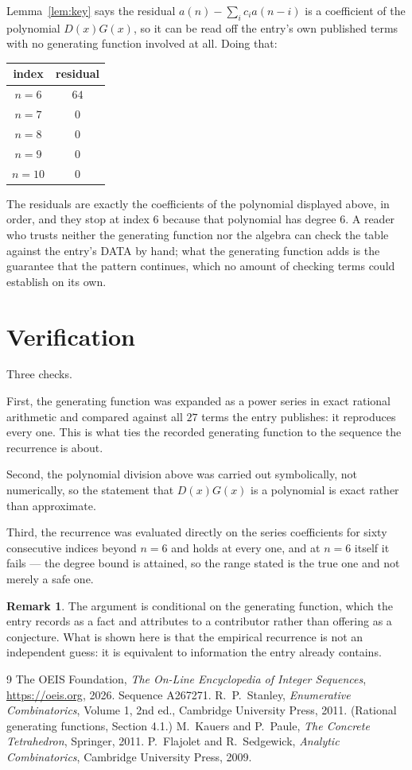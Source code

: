 \documentclass[11pt,a4paper]{article}
\theoremstyle{plain}
\theoremstyle{definition}
\newtheorem{remark}[theorem]{Remark}
\begin{document}
Lemma~\ref{lem:key} says the residual $a(n)-\sum_ic_ia(n-i)$ is a coefficient of the
polynomial $D(x)G(x)$, so it can be read off the entry's own published terms with no
generating function involved at all. Doing that:
\begin{center}
\begin{tabular}{cc}
index & residual \\ \hline
$n=6$ & $64$ \\
$n=7$ & $0$ \\
$n=8$ & $0$ \\
$n=9$ & $0$ \\
$n=10$ & $0$
\end{tabular}
\end{center}
The residuals are exactly the coefficients of the polynomial displayed above, in order, and
they stop at index $6$ because that polynomial has degree $6$. A reader who trusts
neither the generating function nor the algebra can check the table against the entry's DATA
by hand; what the generating function adds is the guarantee that the pattern continues, which
no amount of checking terms could establish on its own.

\section{Verification}

Three checks.

First, the generating function was expanded as a power series in exact rational arithmetic and
compared against all $27$ terms the entry publishes: it reproduces every one. This is
what ties the recorded generating function to the sequence the recurrence is about.

Second, the polynomial division above was carried out symbolically, not numerically, so the
statement that $D(x)G(x)$ is a polynomial is exact rather than approximate.

Third, the recurrence was evaluated directly on the series coefficients for sixty consecutive
indices beyond $n=6$ and holds at every one, and at $n=6$ itself it fails --- the
degree bound is attained, so the range stated is the true one and not merely a safe one.

\begin{remark}
The argument is conditional on the generating function, which the entry records as a fact and
attributes to a contributor rather than offering as a conjecture. What is shown here is that
the empirical recurrence is not an independent guess: it is equivalent to information the
entry already contains.
\end{remark}

\begin{thebibliography}{9}
 The OEIS Foundation, \emph{The On-Line Encyclopedia of Integer
Sequences}, \url{https://oeis.org}, 2026. Sequence A267271.
 R.~P.~Stanley, \emph{Enumerative Combinatorics}, Volume 1, 2nd ed.,
Cambridge University Press, 2011. (Rational generating functions, Section 4.1.)
 M.~Kauers and P.~Paule, \emph{The Concrete Tetrahedron}, Springer, 2011.
 P.~Flajolet and R.~Sedgewick, \emph{Analytic Combinatorics}, Cambridge
University Press, 2009.
\end{thebibliography}
\end{document}
